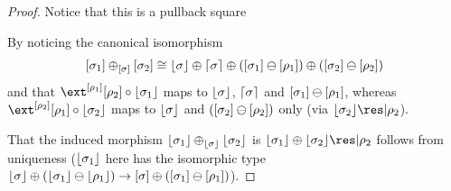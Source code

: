 \begin{proof}\nl
    Notice that this is a pullback square
    \begin{center}
    \end{center}
    By noticing the canonical isomorphism 
    \[ [\sigma_1] \oplus_{[\sigma]} [\sigma_2] \cong \lfloor\sigma\rfloor \oplus \lceil\sigma\rceil \oplus ([\sigma_1] \ominus [\rho_1])
                                                                                               \oplus ([\sigma_2] \ominus [\rho_2]) \]
    and that $\ext^{\anyL{\rho_1}}\anyL{\rho_2} \comp \concL{\sigma_1}$ maps to $\lfloor\sigma\rfloor$, $\lceil\sigma\rceil$ and $[\sigma_1] \ominus [\rho_1]$,
    whereas $\ext^{\anyL{\rho_2}}\anyL{\rho_1} \comp \concL{\sigma_2}$ maps to $\lfloor\sigma\rfloor$ and $([\sigma_2] \ominus [\rho_2])$ only (via $\concL{\sigma_2}\res|{\rho_2}$).

    That the induced morphism $\lfloor\sigma_1\rfloor \oplus_{\lfloor\sigma\rfloor} \lfloor\sigma_2\rfloor$ is $\concL{\sigma_1} \mplus \concL{\sigma_2}\res|{\rho_2}$ follows from uniqueness 
    ($\lfloor\sigma_1\rfloor$ here has the isomorphic type $\lfloor\sigma\rfloor \oplus (\lfloor\sigma_1\rfloor \ominus \lfloor\rho_1\rfloor) \to [\sigma] \oplus ([\sigma_1] \ominus [\rho_1])$). 


\end{proof}

